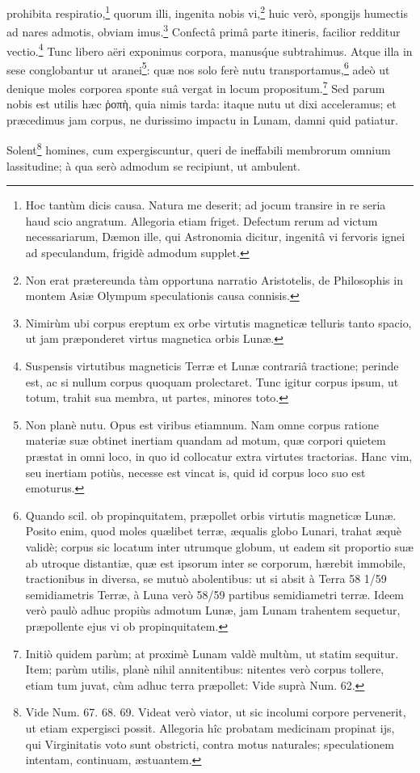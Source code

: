 \documentclass[a4paper, 11pt, oneside, polutonikogreek, german]{article}
\begin{document}
prohibita respiratio,\footnote{Hoc tantùm dicis causa. Natura me deserit; ad jocum transire in re seria haud scio angratum. Allegoria etiam friget. Defectum rerum ad victum necessariarum, Dæmon ille, qui Astronomia dicitur, ingenitâ vi fervoris ignei ad speculandum, frigidè admodum supplet.} quorum illi, ingenita nobis vi,\footnote{Non erat prætereunda tàm opportuna narratio Aristotelis, de Philosophis in montem Asiæ Olympum speculationis causa connisis.} huic verò, spongijs humectis ad nares admotis, obviam imus.\footnote{Nimirùm ubi corpus ereptum ex orbe virtutis magneticæ telluris tanto spacio, ut jam præponderet virtus magnetica orbis Lunæ.} Confectâ primâ parte itineris, facilior redditur vectio.\footnote{Suspensis virtutibus magneticis Terræ et Lunæ contrariâ tractione; perinde est, ac si nullum corpus quoquam prolectaret. Tunc igitur corpus ipsum, ut totum, trahit sua membra, ut partes, minores toto.} Tunc libero aëri exponimus corpora, manus\'que subtrahimus. Atque illa in sese conglobantur ut aranei\footnote{Non planè nutu. Opus est viribus etiamnum. Nam omne corpus ratione materiæ suæ obtinet inertiam quandam ad motum, quæ corpori quietem præstat in omni loco, in quo id collocatur extra virtutes tractorias. Hanc vim, seu inertiam potiùs, necesse est vincat is, quid id corpus loco suo est emoturus.}: quæ nos solo ferè nutu transportamus,\footnote{Quando scil. ob propinquitatem, præpollet orbis virtutis magneticæ Lunæ. Posito enim, quod moles quælibet terræ, æqualis globo Lunari, trahat æquè validè; corpus sic locatum inter utrumque globum, ut eadem sit proportio suæ ab utroque distantiæ, quæ est ipsorum inter se corporum, hærebit immobile, tractionibus in diversa, se mutuò abolentibus: ut si absit à Terra 58 1/59 semidiametris Terræ, à Luna verò 58/59 partibus semidiametri terræ. Ideem verò paulò adhuc propiùs admotum Lunæ, jam Lunam trahentem sequetur, præpollente ejus vi ob propinquitatem.} adeò ut denique moles corporea sponte suâ vergat in locum propositum.\footnote{Initiò quidem parùm; at proximè Lunam valdè multùm, ut statim sequitur. Item; parùm utilis, planè nihil annitentibus: nitentes verò corpus tollere, etiam tum juvat, cùm adhuc terra præpollet: Vide suprà Num. 62.} Sed parum nobis est utilis hæc ῥοπὴ, quia nimis tarda: itaque nutu ut dixi acceleramus; et præcedimus jam corpus, ne durissimo impactu in Lunam, damni quid patiatur.

Solent\footnote{Vide Num. 67. 68. 69. Videat verò viator, ut sic incolumi corpore pervenerit, ut etiam expergisci possit. Allegoria hîc probatam medicinam propinat ijs, qui Virginitatis voto sunt obstricti, contra motus naturales; speculationem intentam, continuam, æstuantem.} homines, cum expergiscuntur, queri de ineffabili membrorum omnium lassitudine; à qua serò admodum se recipiunt, ut ambulent.
\end{document}
